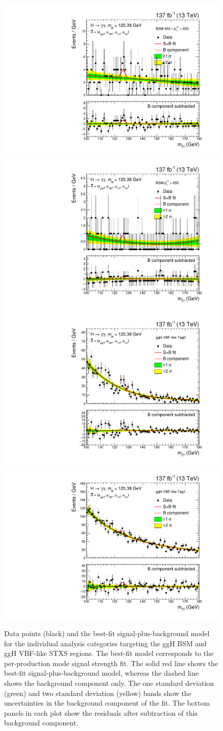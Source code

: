 \begin{figure}[htbp]
  \includegraphics[width=.32\linewidth]{Figures/app_sb_models/RECO_PTH_450_650_Tag0_CMS_hgg_mass.pdf}
  \includegraphics[width=.32\linewidth]{Figures/app_sb_models/RECO_PTH_GT650_Tag0_CMS_hgg_mass.pdf}
  \includegraphics[width=.32\linewidth]{Figures/app_sb_models/RECO_VBFLIKEGGH_Tag0_CMS_hgg_mass.pdf}
  \includegraphics[width=.32\linewidth]{Figures/app_sb_models/RECO_VBFLIKEGGH_Tag1_CMS_hgg_mass.pdf}
  \caption[Observed diphoton mass distributions: ggH BSM and ggH VBF-like]
  {
    Data points (black) and the best-fit signal-plus-background model for the individual analysis categories targeting the ggH BSM and ggH VBF-like STXS regions. The best-fit model corresponds to the per-production mode signal strength fit. The solid red line shows the best-fit signal-plus-background model, whereas the dashed line shows the background component only. The one standard deviation (green) and two standard deviation (yellow) bands show the uncertainties in the background component of the fit. The bottom panels in each plot show the residuals after subtraction of this background component.
  }
  \label{fig:diphoton_mass_2}
\end{figure}

